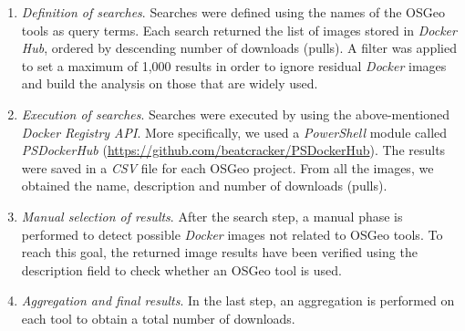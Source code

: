 \documentclass[ijgi,article,submit,moreauthors,pdftex]{Definitions/mdpi}
\begin{document}
\begin{enumerate}
\item \textit{Definition of searches}. Searches were defined using the names of the OSGeo tools as query terms. Each search returned the list of images stored in \textit{Docker Hub}, ordered by descending number of downloads (pulls). A filter was applied to set a maximum of 1,000 results in order to ignore residual \textit{Docker} images and build the analysis on those that are widely used.
\item \textit{Execution of searches}. Searches were executed by using the above-mentioned \textit{Docker Registry API}. More specifically, we used a \textit{PowerShell} module called \textit{PSDockerHub} (\url{https://github.com/beatcracker/PSDockerHub}). The results were saved in a \textit{CSV} file for each OSGeo project. From all the images, we obtained the name, description and number of downloads (pulls). 
\item \textit{Manual selection of results}. After the search step, a manual phase is performed to detect possible \textit{Docker} images not related to OSGeo tools. To reach this goal, the returned image results have been verified using the description field to check whether an OSGeo tool is used.
\item \textit{Aggregation and final results}. In the last step, an aggregation is performed on each tool to obtain a total number of downloads.
\end{enumerate}
\end{document}
